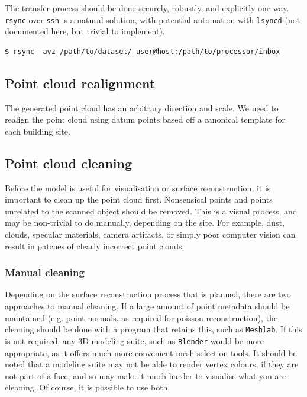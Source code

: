 \documentclass{article}
\begin{document}
The transfer process should be done securely, robustly, and explicitly one-way. {\tt rsync} over {\tt ssh} is a natural solution, with potential automation with {\tt lsyncd} (not documented here, but trivial to implement).

\begin{lstlisting}
$ rsync -avz /path/to/dataset/ user@host:/path/to/processor/inbox
\end{lstlisting}

\subsection{Point cloud realignment}

The generated point cloud has an arbitrary direction and scale. We need to realign the point cloud using datum points based off a canonical template for each building site.

\subsection{Point cloud cleaning}

Before the model is useful for visualisation or surface reconstruction, it is important to clean up the point cloud first. Nonsensical points and points unrelated to the scanned object should be removed. This is a visual process, and may be non-trivial to do manually, depending on the site. For example, dust, clouds, specular materials, camera artifacts, or simply poor computer vision can result in patches of clearly incorrect point clouds.

\subsubsection{Manual cleaning}
Depending on the surface reconstruction process that is planned, there are two approaches to manual cleaning. If a large amount of point metadata should be maintained (e.g. point normals, as required for poisson reconstruction), the cleaning should be done with a program that retains this, such as {\tt Meshlab}. If this is not required, any 3D modeling suite, such as {\tt Blender} would be more appropriate, as it offers much more convenient mesh selection tools. It should be noted that a modeling suite may not be able to render vertex colours, if they are not part of a face, and so may make it much harder to visualise what you are cleaning. Of course, it is possible to use both.
\end{document}
